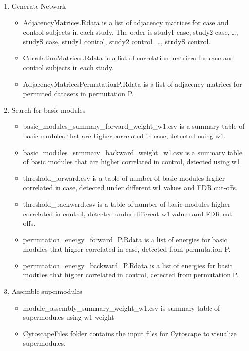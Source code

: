 \begin{enumerate}
\item Generate Network
\begin{itemize}
\item AdjacencyMatrices.Rdata is a list of adjacency matrices for case and control subjects in each study. The order is study1 case, study2 case, \dots, studyS case, study1 control, study2 control, \dots, studyS control.
\item CorrelationMatrices.Rdata is a list of correlation matrices for case and control subjects in each study.
\item AdjacencyMatricesPermutationP.Rdata is a list of adjacency matrices for permuted datasets in permutation P.
\end{itemize}

\item Search for basic modules

\begin{itemize}
 \item basic\_modules\_summary\_forward\_weight\_w1.csv is a summary table of basic modules that are higher correlated in case, detected using w1.
 \item basic\_modules\_summary\_backward\_weight\_w1.csv is a summary table of basic modules that are higher correlated in control, detected using w1.
\item threshold\_forward.csv is a table of number of basic modules higher correlated in case, detected under different w1 values and FDR cut-offs.
\item threshold\_backward.csv is a table of number of basic modules higher correlated in control, detected under different w1 values and FDR cut-offs.
 \item permutation\_energy\_forward\_P.Rdata is a list of energies for basic modules that higher correlated in case, detected from permutation P.
  \item permutation\_energy\_backward\_P.Rdata is a list of energies for basic modules that higher correlated in control, detected from permutation P.
\end{itemize}

\item Assemble supermodules
 \begin{itemize}
\item module\_assembly\_summary\_weight\_w1.csv is summary table of supermodules using w1 weight.
\item CytoscapeFiles folder contains the input files for Cytoscape to visualize supermodules.
\end{itemize}

\end{enumerate}
 

